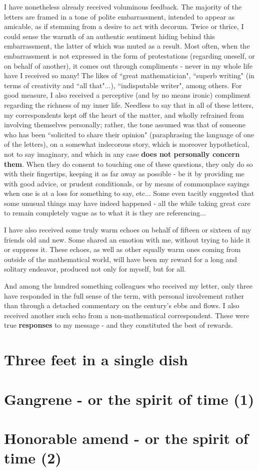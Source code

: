 I have nonetheless already received voluminous feedback. The majority of the letters are framed in a tone of polite embarrassment, intended to appear as amicable, as if stemming from a desire to act with decorum. Twice or thrice, I could sense the warmth of an authentic sentiment hiding behind this embarrassment, the latter of which was muted as a result. Most often, when the embarrassment is not expressed in the form of protestations (regarding oneself, or on behalf of another), it comes out through compliments - never in my whole life have I received so many! The likes of ``great mathematician", ``superb writing" (in terms of creativity and ``all that"...), ``indisputable writer", among others. For good measure, I also received a perceptive (and by no means ironic) compliment regarding the richness of my inner life. Needless to say that in all of these letters, my correspondents kept off the heart of the matter, and wholly refrained from involving themselves personally; rather, the tone assumed was that of someone who has been ``solicited to share their opinion" (paraphrasing the language of one of the letters), on a somewhat indecorous story, which is moreover hypothetical, not to say imaginary, and which in any case \textbf{does not personally concern them}. When they do consent to touching one of these questions, they only do so with their fingertips, keeping it as far away as possible - be it by providing me with good advice, or prudent conditionals, or by means of commonplace sayings when one is at a loss for something to say, etc... Some even tacitly suggested that some unusual things may have indeed happened - all the while taking great care to remain completely vague as to what it is they are referencing...

I have also received some truly warm echoes on behalf of fifteen or sixteen of my friends old and new. Some shared an emotion with me, without trying to hide it or suppress it. These echoes, as well as other equally warm ones coming from outside of the mathematical world, will have been my reward for a long and solitary endeavor, produced not only for myself, but for all.

And among the hundred something colleagues who received my letter, only three have responded in the full sense of the term, with personal involvement rather than through a detached commentary on the century's ebbs and flows. I also received another such echo from a non-mathematical correspondent. These were true \textbf{responses} to my message - and they constituted the best of rewards.

\section{Three feet in a single dish}

\section{Gangrene - or the spirit of time (1)}

\section{Honorable amend - or the spirit of time (2)}










%

